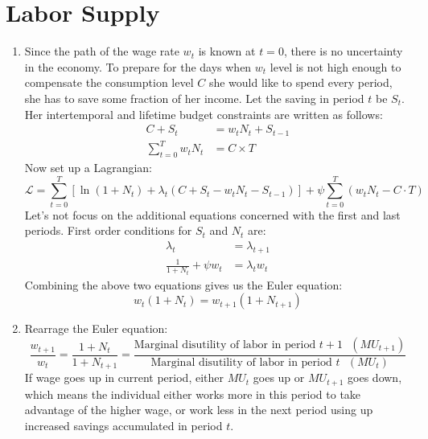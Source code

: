 \documentclass[11pt]{amsart}
\begin{document}
\section{Labor Supply}
\begin{enumerate}[label=(\alph*)]
	\item Since the path of the wage rate $w_t$ is known at $t=0$, there is no uncertainty in the economy. To prepare for the days when $w_t$ level is not high enough to compensate the consumption level $C$ she would like to spend every period, she has to save some fraction of her income. Let the saving in period $t$ be $S_t$. Her intertemporal and lifetime budget constraints are written as follows: 
	\begin{align*}
	C + S_t &= w_t N_t + S_{t-1} \\
	\sum_{t=0}^{T} w_t N_t & = C \times T
	\end{align*} Now set up a Lagrangian: 
	\begin{equation*}
	\mathcal{L} = \sum_{t=0}^{T}  \left[ \ln (1+ N_t) + \lambda_t \left(C + S_t - w_t N_t - S_{t-1} \right) \right] + \psi \sum_{t=0}^{T} \left( w_t N_t - C \cdot T\right)  
	\end{equation*}
    Let's not focus on the additional equations concerned with the first and last periods. First order conditions for $S_t$ and $N_t$ are: 
    \begin{align*}
    \lambda_t &= \lambda_{t+1} \\
    \frac{1}{1+N_t} + \psi w_t &= \lambda_t w_t 
    \end{align*}
    Combining the above two equations gives us the Euler equation: 
    \begin{equation*}
    w_t (1+ N_t) = w_{t+1} (1+N_{t+1})
    \end{equation*}
    \item Rearrage the Euler equation: 
    \begin{equation*}
    \frac{w_{t+1}}{w_t} = \frac{1+N_t}{1+ N_{t+1}} = \frac{\text{Marginal disutility of labor in period $t+1$ } (MU_{t+1}) }{\text{Marginal disutility of labor in period $t$ } (MU_t) }
    \end{equation*}
    If wage goes up in current period, either $MU_t$ goes up or $MU_{t+1}$ goes down, which means the individual either works more in this period to take advantage of the higher wage, or work less in the next period using up increased savings accumulated in period $t$. 
    

\end{enumerate}
\end{document}
